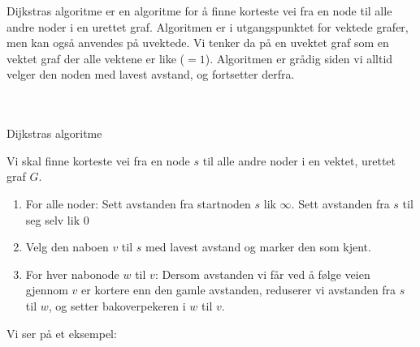 Dijkstras algoritme er en algoritme for å finne korteste vei fra en node til alle andre noder i en urettet graf. Algoritmen er i utgangspunktet for vektede grafer, men kan også anvendes på uvektede. Vi tenker da på en uvektet graf som en vektet graf der alle vektene er like ($ =1 $). Algoritmen er grådig siden vi alltid velger den noden med lavest avstand, og fortsetter derfra. 
~\\~\\~\\
\begin{theorem}Dijkstras algoritme

Vi skal finne korteste vei fra en node $ s $ til alle andre noder i en vektet, urettet graf $ G $. 
\begin{enumerate}
\item For alle noder: Sett avstanden fra startnoden $ s $ lik $ \infty $. Sett avstanden fra $ s $ til seg selv lik 0
\item Velg den naboen $ v $ til $ s $ med lavest avstand og marker den som kjent.
\item For hver nabonode $ w $ til $ v $: Dersom avstanden vi får ved å følge veien gjennom $ v $ er kortere enn den gamle avstanden, reduserer vi avstanden fra $ s $ til $ w $, og setter bakoverpekeren i $ w $ til $ v $. 
\end{enumerate}
\end{theorem}


\noindent Vi ser på et eksempel:

